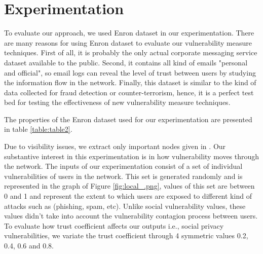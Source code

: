 \section{Experimentation} \label{sec:Experimentation}

To evaluate our approach,
	we used Enron dataset in our experimentation.
There are many reasons for using Enron dataset to evaluate our vulnerability measure techniques.
First of all,
	it is probably the only actual corporate messaging service dataset available to the public.
Second,
	it contains all kind of emails "personal and official",
	so email logs can reveal the level of trust between users by studying the information flow in the network.
Finally,
	this dataset is similar to the kind of data collected for fraud detection or counter-terrorism,
	hence,
	it is a perfect test bed for testing the effectiveness of new vulnerability measure techniques.

The properties of the Enron dataset used for our experimentation are presented in table \ref{table:table2}.



Due to visibility issues,
	we extract only important nodes given in \cite{shetty_discovering_2005}.
Our substantive interest in this experimentation is in how vulnerability moves through the network.
The inputs of our experimentation consist of a set of individual vulnerabilities of users in the network.
This set is generated randomly and is represented in the graph of Figure \ref{fig:local_.png},
	values of this set are between 0 and 1 and represent the extent to which users are exposed to different kind of attacks such as (phishing, spam, etc).
Unlike social vulnerability values,
	these values didn't take into account the vulnerability contagion process between users.
To evaluate how trust coefficient affects our outputs i.e., social privacy vulnerabilities,
	we variate the trust coefficient through 4 symmetric values 0.2, 0.4, 0.6 and 0.8.



